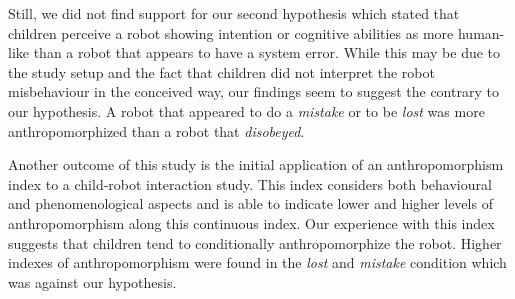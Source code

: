 \documentclass{sig-alternate}
\begin{document}
%
%
%


Still, we did not find support for our second hypothesis which stated that children
perceive a robot showing intention or cognitive abilities as more human-like
than a robot that appears to have a system error. While this may be due to the study
setup and the fact that children did not interpret the robot misbehaviour in the
conceived way, our findings seem to suggest the contrary to our hypothesis. A
robot that appeared to do a \textit{mistake} or to be \textit{lost} was more
anthropomorphized than a robot that \textit{disobeyed}.


Another outcome of this study is the initial application of an
anthropomorphism index to a child-robot interaction study. This index
considers both behavioural and phenomenological aspects and is able to indicate
lower and higher levels of anthropomorphism along this continuous index.  Our
experience with this index suggests that children tend to conditionally
anthropomorphize the robot. Higher indexes of anthropomorphism were found in the
\textit{lost} and \textit{mistake} condition which was against our hypothesis.
\end{document}

